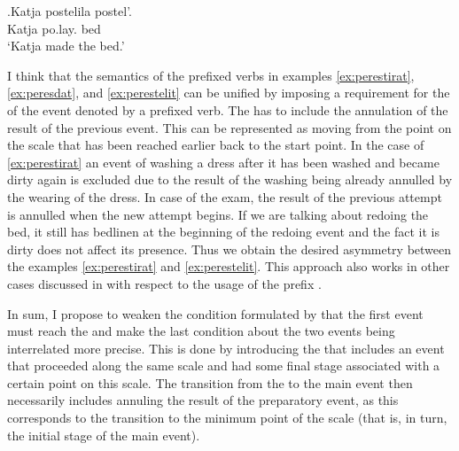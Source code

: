 \exg.\label{ex:postelit}Katja postelila postel'.\\
Katja po.lay. bed\\
\trans `Katja made the bed.'

I think that the semantics of the prefixed verbs in examples \ref{ex:perestirat}, \ref{ex:peresdat}, and \ref{ex:perestelit} can be unified by imposing a requirement for the  of the event denoted by a prefixed verb. The  has to include the annulation of the result of the previous event. This can be represented as moving from the point on the scale that has been reached earlier back to the start point. In the case of \ref{ex:perestirat} an event of washing a dress after it has been washed and became dirty again is excluded due to the result of the washing being already annulled by the wearing of the dress. In case of the exam, the result of the previous attempt is annulled when the new attempt begins. If we are talking about redoing the bed, it still has bedlinen at the beginning of the redoing event and the fact it is dirty does not affect its presence. Thus we obtain the desired asymmetry between the examples \ref{ex:perestirat} and \ref{ex:perestelit}. This approach also works in other cases discussed in \citealt{Kagan:book} with respect to the  usage of the prefix .

In sum, I propose to weaken the condition formulated by \citet{Kagan:book} that the first event must reach the  and make the last condition about the two events being interrelated more precise. This is done by introducing the  that includes an event that proceeded along the same scale and had some final stage associated with a certain point on this scale. The transition from the  to the main event then necessarily includes annuling the result of the preparatory event, as this corresponds to the transition to the minimum point of the scale (that is, in turn, the initial stage of the main event).

